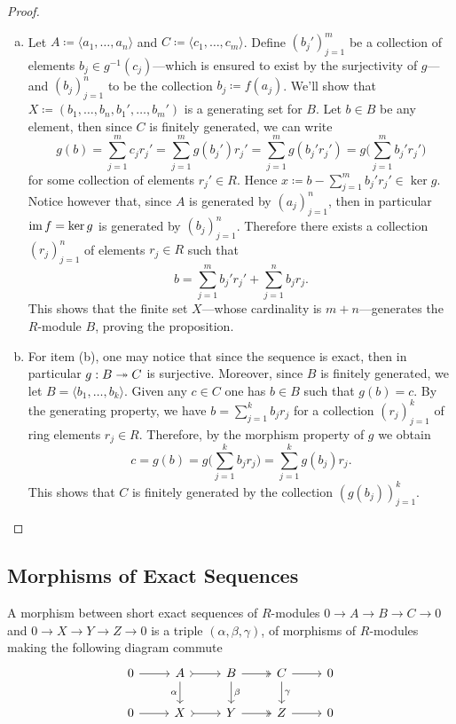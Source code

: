 \begin{proof}
\begin{enumerate}[(a)]\setlength\itemsep{0em}
\item Let \(A \coloneq \langle a_1, \dots, a_n \rangle\) and
  \(C \coloneq \langle c_1, \dots, c_m \rangle\). Define \((b_j')_{j=1}^m\) be a
  collection of elements \(b_j \in g^{-1}(c_j)\)---which is ensured to exist by
  the surjectivity of \(g\)---and \((b_j)_{j=1}^n\) to be the collection
  \(b_j \coloneq f(a_j)\). We'll show that
  \(X \coloneq (b_1, \dots, b_n, b_1', \dots, b_m')\) is a generating set for
  \(B\). Let \(b \in B\) be any element, then since \(C\) is finitely generated,
  we can write
  \[
  g(b) = \sum_{j=1}^m c_j r_j'
  = \sum_{j=1}^m g(b_j') r_j'
  = \sum_{j=1}^m g(b_j' r_j')
  = g\Big(\sum_{j=1}^m b_j' r_j' \Big)
  \]
  for some collection of elements \(r_j' \in R\). Hence
  \(x \coloneq b - \sum_{j=1}^m b_j' r_j' \in \ker g\). Notice however that,
  since \(A\) is generated by \((a_j)_{j=1}^n\), then in particular
  \(\operatorname{im} f = \ker g\) is generated by \((b_j)_{j=1}^n\). Therefore there exists a
  collection \((r_j)_{j=1}^n\) of elements \(r_j \in R\) such that
  \[
  b = \sum_{j=1}^m b_j' r_j' + \sum_{j=1}^n b_j r_j.
  \]
  This shows that the finite set \(X\)---whose cardinality is
  \(m + n\)---generates the \(R\)-module \(B\), proving the proposition.

\item For item (b), one may notice that since the sequence is exact, then in
  particular \(g: B \twoheadrightarrow C\) is surjective. Moreover, since \(B\) is finitely
  generated, we let \(B = \langle b_1, \dots, b_k \rangle\). Given any
  \(c \in C\) one has \(b \in B\) such that \(g(b) = c\). By the generating
  property, we have \(b = \sum_{j=1}^k b_j r_j\) for a collection
  \((r_j)_{j=1}^k\) of ring elements \(r_j \in R\). Therefore, by the morphism
  property of \(g\) we obtain
  \[
  c = g(b) = g\Big(\sum_{j=1}^k b_j r_j \Big) = \sum_{j=1}^k g(b_j) r_j.
  \]
  This shows that \(C\) is finitely generated by the collection
  \((g(b_j))_{j=1}^k\).
\end{enumerate}
\end{proof}

\subsection{Morphisms of Exact Sequences}

\begin{definition}
\label{def:morphism-short-exact-sequences}
A morphism between short exact sequences of \(R\)-modules
\(0 \to A \to B \to C \to 0\) and \(0 \to X \to Y \to Z \to 0\) is a triple
\((\alpha, \beta, \gamma)\), of morphisms of \(R\)-modules making the following
diagram commute
\[
\begin{tikzcd}
0 \ar[r] &A \ar[r, tail] \ar[d, "\alpha"']
&B \ar[r, two heads] \ar[d, "\beta"]
&C \ar[r] \ar[d, "\gamma"]
&0 \\
0 \ar[r] &X \ar[r, tail] &Y \ar[r, two heads] &Z \ar[r] &0
\end{tikzcd}
\]
\end{definition}

